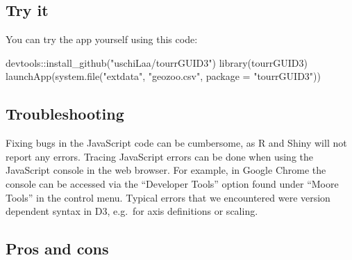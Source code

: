 \begin{Schunk}
\end{Schunk}

\hypertarget{try-it}{%
\subsection{Try it}\label{try-it}}

You can try the app yourself using this code:

\begin{Schunk}
\begin{Sinput}
devtools::install_github("uschiLaa/tourrGUID3")
library(tourrGUID3)
launchApp(system.file("extdata", "geozoo.csv", package = "tourrGUID3"))
\end{Sinput}
\end{Schunk}

\hypertarget{troubleshooting}{%
\subsection{Troubleshooting}\label{troubleshooting}}

Fixing bugs in the JavaScript code can be cumbersome, as R and Shiny
will not report any errors. Tracing JavaScript errors can be done when
using the JavaScript console in the web browser. For example, in Google
Chrome the console can be accessed via the ``Developer Tools'' option
found under ``Moore Tools'' in the control menu. Typical errors that we
encountered were version dependent syntax in D3, e.g.~for axis
definitions or scaling.

\hypertarget{pros-and-cons}{%
\subsection{Pros and cons}\label{pros-and-cons}}

